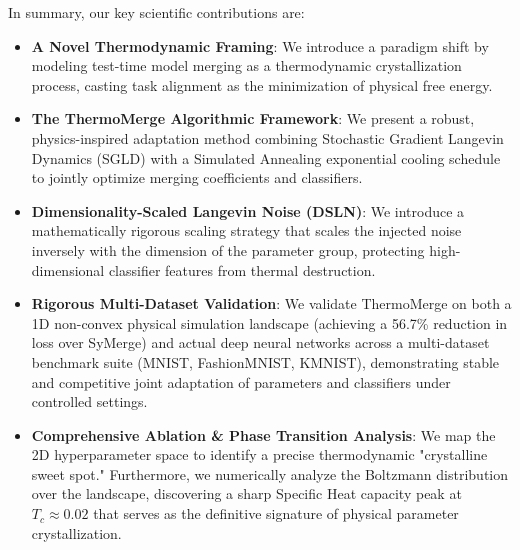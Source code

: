 In summary, our key scientific contributions are:
\begin{itemize}
\item \textbf{A Novel Thermodynamic Framing}: We introduce a paradigm shift by modeling test-time model merging as a thermodynamic crystallization process, casting task alignment as the minimization of physical free energy.
\item \textbf{The ThermoMerge Algorithmic Framework}: We present a robust, physics-inspired adaptation method combining Stochastic Gradient Langevin Dynamics (SGLD) with a Simulated Annealing exponential cooling schedule to jointly optimize merging coefficients and classifiers.
\item \textbf{Dimensionality-Scaled Langevin Noise (DSLN)}: We introduce a mathematically rigorous scaling strategy that scales the injected noise inversely with the dimension of the parameter group, protecting high-dimensional classifier features from thermal destruction.
\item \textbf{Rigorous Multi-Dataset Validation}: We validate ThermoMerge on both a 1D non-convex physical simulation landscape (achieving a 56.7\% reduction in loss over SyMerge) and actual deep neural networks across a multi-dataset benchmark suite (MNIST, FashionMNIST, KMNIST), demonstrating stable and competitive joint adaptation of parameters and classifiers under controlled settings.
\item \textbf{Comprehensive Ablation \& Phase Transition Analysis}: We map the 2D hyperparameter space to identify a precise thermodynamic "crystalline sweet spot." Furthermore, we numerically analyze the Boltzmann distribution over the landscape, discovering a sharp Specific Heat capacity peak at $T_c \approx 0.02$ that serves as the definitive signature of physical parameter crystallization.
\end{itemize}
